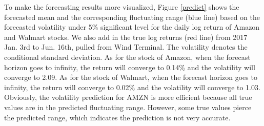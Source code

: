 \documentclass[paper=a4, fontsize=11pt]{article}
\begin{document}
To make the forecasting results more visualized, Figure \ref{predict} shows the forecasted mean and the corresponding fluctuating range (blue line) based on the forecasted volatility under 5\% significant level for the daily log return of Amazon and Walmart stocks. We also add in the true log returns (red line) from 2017 Jan. 3rd to Jun. 16th, pulled from Wind Terminal. The volatility denotes the conditional standard deviation. As for the stock of Amazon, when the forecast horizon goes to infinity, the return will converge to 0.14\% and the volatility will converge to 2.09. As for the stock of Walmart, when the forecast horizon goes to infinity, the return will converge to 0.02\% and the volatility will converge to 1.03. Obviously, the volatility prediction for AMZN is more efficient because all true values are in the predicted fluctuating range. However, some true values pierce the predicted range, which indicates the prediction is not very accurate.
\end{document}
